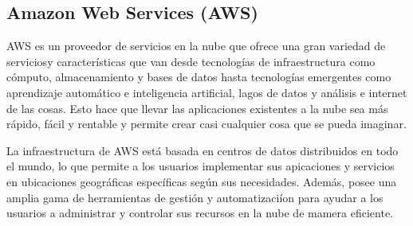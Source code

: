 \subsection{Amazon Web Services (AWS)}
AWS es un proveedor de servicios en la nube que ofrece una gran variedad de serviciosy características que van desde tecnologías de infraestructura como cómputo, almacenamiento y bases de datos hasta tecnologías emergentes como aprendizaje automático e inteligencia artificial, lagos de datos y análisis e internet de las cosas. Esto hace que llevar las aplicaciones existentes a la nube sea más rápido, fácil y rentable y permite crear casi cualquier cosa que se pueda imaginar.

La infraestructura de AWS está basada en centros de datos distribuidos en todo el mundo, lo que permite a los usuarios implementar sus apicaciones y servicios en ubicaciones geográficas específicas según sus necesidades. Además, posee una amplia gama de herramientas de gestión y automatizaciíon para ayudar a los usuarios a administrar y controlar sus recursos en la nube de mamera eficiente.
    